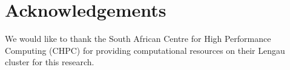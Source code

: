 \documentclass{article}
\begin{document}
\vspace{-2mm}

\section{Acknowledgements}
\label{sec:ack}

\vspace{-2mm}

We would like to thank the South African Centre for High Performance Computing (CHPC) for providing computational resources on their Lengau cluster for this research.





\end{document}
